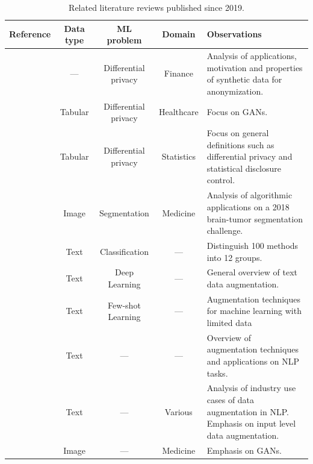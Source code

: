 \documentclass[parskip=full]{scrartcl}
\begin{document}
\begin{table}[t!]
    \centering
    \caption{\label{tab:literature-reviews}
        Related literature reviews published since 2019.
    }
    \small{%
    \begin{tabularx}{\textwidth}{@{}rcccX@{}}
        \toprule
        Reference & Data type & ML problem & Domain & Observations \\
        \midrule

        \citet{assefa2020generating} & --- & Differential privacy &
        Finance & Analysis of applications, motivation and properties of
        synthetic data for anonymization. \\

        \citet{hernandez2022synthetic} & Tabular & Differential privacy &
        Healthcare & Focus on GANs. \\

        \citet{raghunathan2021synthetic} & Tabular & Differential privacy &
        Statistics & Focus on general definitions such as differential privacy
        and statistical disclosure control.\\

        \citet{nalepa2019data} & Image & Segmentation & Medicine & Analysis of
        algorithmic applications on a 2018 brain-tumor segmentation
        challenge.\\

        \citet{bayer2021survey} & Text & Classification & --- & Distinguish
        100 methods into 12 groups. \\

        \citet{shorten2021text} & Text & Deep Learning & --- & General
        overview of text data augmentation. \\

        \citet{chen2021empirical} & Text & Few-shot Learning & --- &
        Augmentation techniques for machine learning with limited data\\

        \citet{feng2021survey} & Text & --- & --- & Overview of augmentation
        techniques and applications on NLP tasks.\\

        \citet{liu2020survey} & Text & --- & Various & Analysis of industry
        use cases of data augmentation in NLP\@. Emphasis on input level data
        augmentation.\\

        \citet{yi2019generative} & Image & --- & Medicine & Emphasis on GANs.\\


\end{tabularx}}
\end{table}
\end{document}
